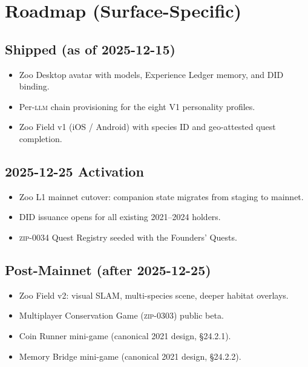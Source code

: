 \section{Roadmap (Surface-Specific)}
\label{sec:roadmap}

\subsection{Shipped (as of 2025-12-15)}

\begin{itemize}[nosep,leftmargin=1.2em]
\item Zoo Desktop avatar with \Zen{} models, Experience Ledger
  memory, and DID binding.
\item Per-\textsc{llm} chain provisioning for the eight V1 personality
  profiles.
\item Zoo Field \AR{} v1 (iOS / Android) with species ID and
  geo-attested quest completion.
\end{itemize}

\subsection{2025-12-25 Activation}

\begin{itemize}[nosep,leftmargin=1.2em]
\item Zoo L1 mainnet cutover: companion state migrates from staging to
  mainnet.
\item DID issuance opens for all existing 2021--2024 holders.
\item \textsc{zip-0034} Quest Registry seeded with the Founders'
  Quests.
\end{itemize}

\subsection{Post-Mainnet (after 2025-12-25)}

\begin{itemize}[nosep,leftmargin=1.2em]
\item Zoo Field \AR{} v2: visual SLAM, multi-species scene, deeper
  habitat overlays.
\item Multiplayer Conservation Game (\textsc{zip-0303}) public beta.
\item Coin Runner mini-game (canonical 2021 design, \S24.2.1).
\item Memory Bridge mini-game (canonical 2021 design, \S24.2.2).
\end{itemize}

